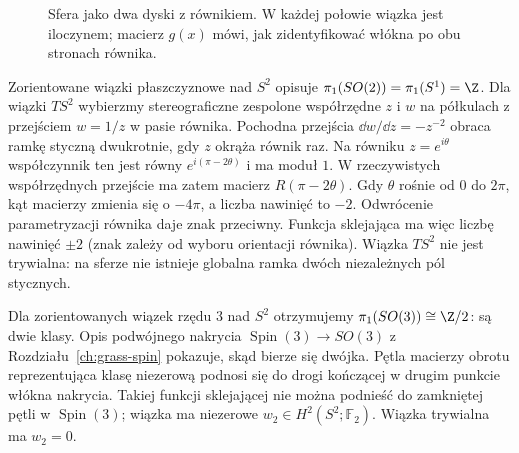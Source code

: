 \begin{figure}[H]
\centering
{}
\caption{Sfera jako dwa dyski z równikiem.
W każdej połowie wiązka jest iloczynem;
macierz $g(x)$ mówi, jak zidentyfikować
włókna po obu stronach równika.}
\label{fig:clutching-16}
\end{figure}

\begin{przyklad}
Zorientowane wiązki płaszczyznowe
nad $S^2$ opisuje
$\pi_1(SO(2))=\pi_1(S^1)=\Z$.
Dla wiązki $TS^2$ wybierzmy
stereograficzne zespolone
współrzędne $z$ i $w$
na półkulach z przejściem
$w=1/z$ w pasie równika.
Pochodna przejścia
$\dd w/\dd z=-z^{-2}$
obraca ramkę styczną
dwukrotnie, gdy $z$
okrąża równik raz.
Na równiku $z=e^{i\theta}$ współczynnik ten jest równy
$e^{i(\pi-2\theta)}$ i ma moduł $1$.
W rzeczywistych współrzędnych przejście ma zatem macierz
$R(\pi-2\theta)$.
Gdy $\theta$ rośnie od $0$ do $2\pi$, kąt macierzy
zmienia się o $-4\pi$, a liczba nawinięć to $-2$.
Odwrócenie parametryzacji równika daje znak przeciwny.
Funkcja sklejająca ma
więc liczbę nawinięć
$\pm2$ (znak zależy
od wyboru orientacji
równika). Wiązka $TS^2$
nie jest trywialna:
na sferze nie istnieje
globalna ramka dwóch
niezależnych pól stycznych.
\end{przyklad}

\begin{przyklad}
Dla zorientowanych wiązek
rzędu $3$ nad $S^2$
otrzymujemy
$\pi_1(SO(3))\cong\Z/2$:
są dwie klasy.
Opis podwójnego nakrycia
$\operatorname{Spin}(3)\to SO(3)$
z Rozdziału~\ref{ch:grass-spin}
pokazuje, skąd bierze się
dwójka. Pętla macierzy
obrotu reprezentująca
klasę niezerową podnosi
się do drogi kończącej
w drugim punkcie włókna
nakrycia. Takiej
funkcji sklejającej
nie można podnieść
do zamkniętej pętli
w $\operatorname{Spin}(3)$;
wiązka ma niezerowe
$w_2\in H^2(S^2;\mathbb F_2)$.
Wiązka trywialna ma
$w_2=0$.
\end{przyklad}

